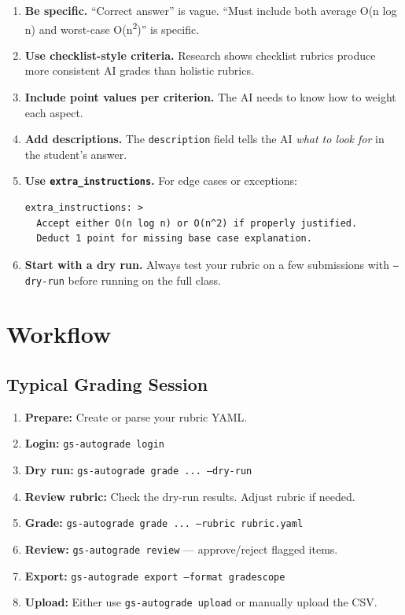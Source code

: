 \documentclass[11pt,a4paper]{article}
\begin{document}
\begin{enumerate}[itemsep=5pt]
    \item \textbf{Be specific.} ``Correct answer'' is vague. ``Must include both average O(n log n) and worst-case O(n\textsuperscript{2})'' is specific.

    \item \textbf{Use checklist-style criteria.} Research shows checklist rubrics produce more consistent AI grades than holistic rubrics.

    \item \textbf{Include point values per criterion.} The AI needs to know how to weight each aspect.

    \item \textbf{Add descriptions.} The \texttt{description} field tells the AI \textit{what to look for} in the student's answer.

    \item \textbf{Use \texttt{extra\_instructions}.} For edge cases or exceptions:
\begin{lstlisting}[style=yamlstyle]
extra_instructions: >
  Accept either O(n log n) or O(n^2) if properly justified.
  Deduct 1 point for missing base case explanation.
\end{lstlisting}

    \item \textbf{Start with a dry run.} Always test your rubric on a few submissions with \texttt{--dry-run} before running on the full class.
\end{enumerate}

\section{Workflow}

\subsection{Typical Grading Session}

\begin{enumerate}[itemsep=5pt]
    \item \textbf{Prepare:} Create or parse your rubric YAML.
    \item \textbf{Login:} \texttt{gs-autograde login}
    \item \textbf{Dry run:} \texttt{gs-autograde grade ... --dry-run}
    \item \textbf{Review rubric:} Check the dry-run results. Adjust rubric if needed.
    \item \textbf{Grade:} \texttt{gs-autograde grade ... --rubric rubric.yaml}
    \item \textbf{Review:} \texttt{gs-autograde review} — approve/reject flagged items.
    \item \textbf{Export:} \texttt{gs-autograde export --format gradescope}
    \item \textbf{Upload:} Either use \texttt{gs-autograde upload} or manually upload the CSV.
\end{enumerate}
\end{document}
